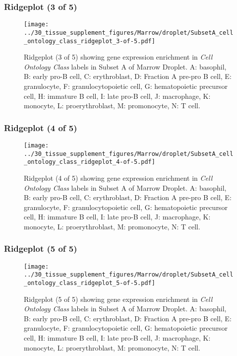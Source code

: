 \clearpage

\subsubsection{Ridgeplot (3 of 5)}
\begin{figure}[h]
\centering
\texttt{[image: ../30\_tissue\_supplement\_figures/Marrow/droplet/SubsetA\_cell\_ontology\_class\_ridgeplot\_3-of-5.pdf]}

\caption{ Ridgeplot (3 of 5)  showing gene expression enrichment in \emph{Cell Ontology Class} labels in Subset A of Marrow Droplet. A: basophil, B: early pro-B cell, C: erythroblast, D: Fraction A pre-pro B cell, E: granulocyte, F: granulocytopoietic cell, G: hematopoietic precursor cell, H: immature B cell, I: late pro-B cell, J: macrophage, K: monocyte, L: proerythroblast, M: promonocyte, N: T cell.}
\end{figure}


\clearpage

\subsubsection{Ridgeplot (4 of 5)}
\begin{figure}[h]
\centering
\texttt{[image: ../30\_tissue\_supplement\_figures/Marrow/droplet/SubsetA\_cell\_ontology\_class\_ridgeplot\_4-of-5.pdf]}

\caption{ Ridgeplot (4 of 5)  showing gene expression enrichment in \emph{Cell Ontology Class} labels in Subset A of Marrow Droplet. A: basophil, B: early pro-B cell, C: erythroblast, D: Fraction A pre-pro B cell, E: granulocyte, F: granulocytopoietic cell, G: hematopoietic precursor cell, H: immature B cell, I: late pro-B cell, J: macrophage, K: monocyte, L: proerythroblast, M: promonocyte, N: T cell.}
\end{figure}


\clearpage

\subsubsection{Ridgeplot (5 of 5)}
\begin{figure}[h]
\centering
\texttt{[image: ../30\_tissue\_supplement\_figures/Marrow/droplet/SubsetA\_cell\_ontology\_class\_ridgeplot\_5-of-5.pdf]}

\caption{ Ridgeplot (5 of 5)  showing gene expression enrichment in \emph{Cell Ontology Class} labels in Subset A of Marrow Droplet. A: basophil, B: early pro-B cell, C: erythroblast, D: Fraction A pre-pro B cell, E: granulocyte, F: granulocytopoietic cell, G: hematopoietic precursor cell, H: immature B cell, I: late pro-B cell, J: macrophage, K: monocyte, L: proerythroblast, M: promonocyte, N: T cell.}
\end{figure}


